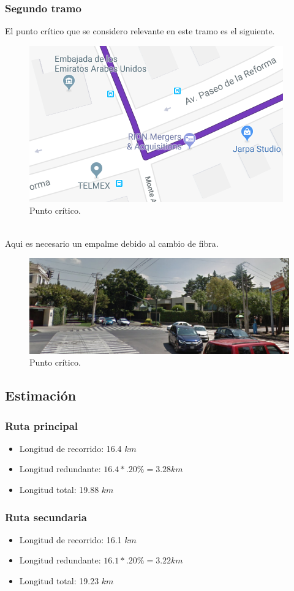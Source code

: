 \documentclass[12pt,letterpaper]{article}
\begin{document}
\newpage
\subsubsection{Segundo tramo}
El punto crítico que se considero relevante en este tramo es el siguiente.
\begin{figure}[ht]
    \centering
    \includegraphics[width=.4\textwidth]{f28.png}
    \caption{Punto crítico.}
\end{figure}
\\
Aqui es necesario un empalme debido al cambio de fibra.
\begin{figure}[ht]
    \centering
    \includegraphics[width=.8\textwidth]{f29.png}
    \caption{Punto crítico.}
\end{figure}

\newpage
\subsection{Estimación}
\subsubsection{Ruta principal}
\begin{itemize}
    \item Longitud de recorrido: 16.4 $km$
    \item Longitud redundante: $16.4*.20\%=3.28km$
    \item Longitud total: 19.88 $km$
\end{itemize}

\subsubsection{Ruta secundaria}
\begin{itemize}
    \item Longitud de recorrido: 16.1 $km$
    \item Longitud redundante: $16.1*.20\%=3.22km$
    \item Longitud total: 19.23 $km$ 
\end{itemize}
\end{document}

